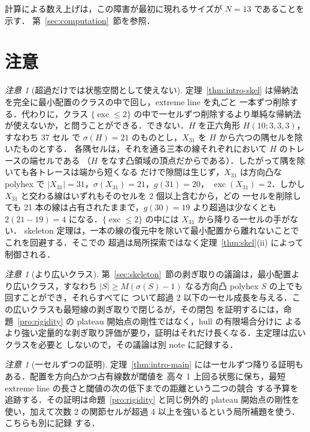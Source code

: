 \documentclass[11pt]{article}
\theoremstyle{plain}
\theoremstyle{definition}
\theoremstyle{remark}
\newtheorem{remark}[theorem]{注意}
\DeclareMathOperator{\exc}{exc}
\begin{document}
計算による数え上げは，この障害が最初に現れるサイズが \(N=13\) であることを示す．
第~\ref{sec:computation}~節を参照．



\section{注意}\label{sec:remarks}

\begin{remark}[超過だけでは状態空間として使えない]\label{rem:x31}
定理~\ref{thm:intro-skel} は帰納法を完全に最小配置のクラスの中で回し，extreme line を丸ごと
一本ずつ削除する．代わりに，クラス \(\{\exc\le2\}\) の中で一セルずつ削除するより単純な帰納法
が使えないか，と問うことができる．できない．\(H\) を正六角形 \(H(10;3,3,3)\)，すなわち 37 セル
で \(\sigma(H)=21\) のものとし，\(X_{31}\) を \(H\) から六つの隅セルを除いたものとする．
各隅セルは，それを通る三本の線それぞれにおいて \(H\) のトレースの端セルである
（\(H\) をなす凸領域の頂点だからである）．したがって隅を除いても各トレースは端から短くなる
だけで隙間は生じず，\(X_{31}\) は方向凸な polyhex で \(|X_{31}|=31\)，\(\sigma(X_{31})=21\)，\(g(31)=20\)，
\(\exc(X_{31})=2\)．しかし \(X_{31}\) と交わる線はいずれもそのセルを 2 個以上含むから，どの
一セルを削除しても 21 本の線は占有されたままで，\(g(30)=19\) より超過は少なくとも
\(2(21-19)=4\) になる．\(\{\exc\le2\}\) の中には \(X_{31}\) から降りる一セルの手がない．
skeleton 定理は，一本の線の復元中を除いて最小配置から離れないことでこれを回避する．そこでの
超過は局所探索ではなく定理~\ref{thm:skel}(ii) によって制御される．
\end{remark}

\begin{remark}[より広いクラス]\label{rem:nearext}
第~\ref{sec:skeleton}~節の剥ぎ取りの議論は，最小配置より広いクラス，すなわち
\(|S|\ge M(\sigma(S)-1)\) なる方向凸 polyhex \(S\) の上でも回すことができ，それらすべてに
ついて超過 2 以下の一セル成長を与える．この広いクラスも最短線の剥ぎ取りで閉じるが，その閉包
を証明するには，命題~\ref{pro:rigidity} の plateau 開始点の剛性ではなく，hull の有限場合分けに
よるより強い定量的な剥ぎ取り評価が要り，証明はそれだけ長くなる．主定理は広いクラスを必要と
しないので，その議論は別 note に記録する．
\end{remark}

\begin{remark}[一セルずつの証明]\label{rem:onecell}
定理~\ref{thm:intro-main} には一セルずつ降りる証明もある．配置を方向凸かつ占有線数が閾値を
高々 1 上回る状態に保ち，最短 extreme line の長さと閾値の次の低下までの距離という二つの競合
する予算を追跡する．その証明は命題~\ref{pro:rigidity} と同じ例外的 plateau 開始点の剛性を
使い，加えて次数 2 の関節セルが超過 4 以上を強いるという局所補題を使う．こちらも別に記録
する．
\end{remark}
\end{document}
